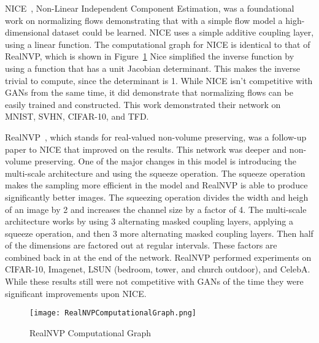 NICE~\cite{nice}, Non-Linear Independent Component Estimation,  was a
foundational work on normalizing flows demonstrating that with a simple flow
model a high-dimensional dataset could be learned. NICE uses a simple additive
coupling layer, using a linear function. The computational graph for NICE is
identical to that of RealNVP, which is shown in Figure~\ref{fig:compGraph}
Nice simplified the inverse function by
using a function that has a unit Jacobian determinant. This makes the inverse
trivial to compute, since the determinant is 1. While NICE isn't competitive
with GANs from the same time, it did demonstrate that normalizing flows can be
easily trained and constructed. This work demonstrated their network on MNIST,
SVHN, CIFAR-10, and TFD.

RealNVP~\cite{realnvp}, which stands for real-valued non-volume preserving, was
a follow-up paper to NICE that improved on the results. This network was deeper
and non-volume preserving. One of the major changes in this model is introducing
the multi-scale architecture and using the squeeze operation. The squeeze
operation makes the sampling more efficient in the model and RealNVP is able to
produce significantly better images. The squeezing operation divides the width
and heigh of an image by 2 and increases the channel size by a factor of 4. 
The multi-scale architecture works by using 3 alternating masked coupling
layers, applying a squeeze operation, and then 3 more alternating masked
coupling layers. Then half of the dimensions are factored out at regular
intervals. These factors are combined back in at the end of the network. 
RealNVP performed experiments on CIFAR-10, Imagenet, LSUN (bedroom, tower, and
church outdoor), and CelebA. While these results still were not competitive with
GANs of the time they were significant improvements upon NICE.
%
\begin{figure}
\center\texttt{[image: RealNVPComputationalGraph.png]}
\caption{RealNVP Computational Graph}
\label{fig:compGraph}
\end{figure}
%

